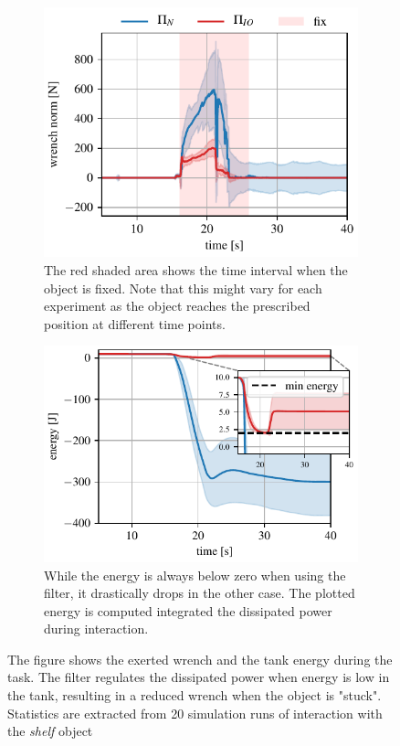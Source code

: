 \begin{figure}[t]
\centering
\hspace*{-0.0cm} 
\begin{subfigure}{0.8\columnwidth}
    \includegraphics[width=\linewidth]{figures/fix_experiment/wrench_with_without_tank.pdf}
    \caption{The red shaded area shows the time interval when the object is fixed. Note that this might vary for each experiment as the object reaches the prescribed position at different time points.}
\end{subfigure}
\hspace*{-0.0cm} 
\begin{subfigure}{0.8\columnwidth}
    \includegraphics[width=\linewidth]{figures/fix_experiment/energy_with_without_tank.pdf}
    \caption{While the energy is always below zero when using the filter, it drastically drops in the other case. The plotted energy is computed integrated the dissipated power during interaction.}
\end{subfigure}
\hfill
\caption{The figure shows the exerted wrench and the tank energy during the task. The filter regulates the dissipated power when energy is low in the tank, resulting in a reduced wrench when the object is "stuck". Statistics are extracted from 20 simulation runs of interaction with the \textit{shelf} object}\label{fig:tank_comparison}
\end{figure}

